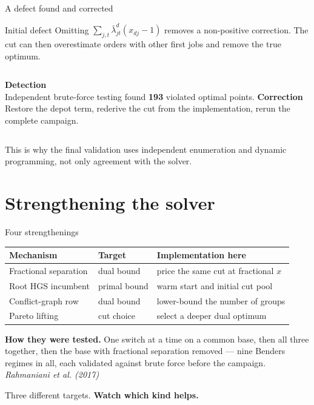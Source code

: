 \begin{frame}{A defect found and corrected}
\vspace{0.24cm}
\begin{block}{Initial defect}
Omitting
$\sum_{j,t}\bar\lambda^d_{jt}(x_{dj}-1)$ removes a non-positive correction.
The cut can then overestimate orders with other first jobs and remove the true optimum.
\end{block}
\vspace{0.3cm}
\begin{columns}[T,onlytextwidth]
\textbf{Detection}\\[.15cm]
Independent brute-force testing found \textbf{193} violated optimal points.
\textbf{Correction}\\[.15cm]
Restore the depot term, rederive the cut from the implementation, rerun the complete campaign.
\end{columns}
\vspace{0.32cm}
\centering\small
This is why the final validation uses independent enumeration and dynamic programming,
not only agreement with the solver.
\end{frame}

\renewcommand{\sectionblurb}{Four standard accelerations. One aims at the incumbent, three at the bound. Only one of them helps.}
\section{Strengthening the solver}

\begin{frame}{Four strengthenings}
\vspace{0.22cm}
\begin{tabular}{@{}p{.28\linewidth}p{.21\linewidth}p{.39\linewidth}@{}}
\toprule
\textbf{Mechanism} & \textbf{Target} & \textbf{Implementation here}\\
\midrule
Fractional separation & dual bound & price the same cut at fractional $x$\\[3pt]
Root HGS incumbent & primal bound & warm start and initial cut pool\\[3pt]
Conflict-graph row & dual bound & lower-bound the number of groups\\[3pt]
Pareto lifting & cut choice & select a deeper dual optimum\\
\bottomrule
\end{tabular}\par
\vspace{0.26cm}
{\small \textbf{How they were tested.} One switch at a time on a common base, then all three
together, then the base with fractional separation removed --- nine Benders regimes in all,
each validated against brute force before the campaign.
{\itshape\color{muted}Rahmaniani et al. (2017)}}

\vspace{0.2cm}
\centering
Three different targets. \textbf{Watch which kind helps.}
\end{frame}

